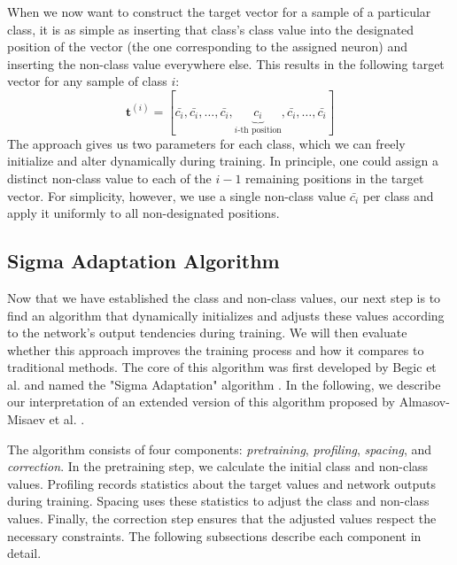 \documentclass[12pt,fleqn,a4paper]{article}
\begin{document}
When we now want to construct the target vector for a sample of a particular class, it is as simple as inserting that class's class value into the designated position of the vector (the one corresponding to the assigned neuron) and inserting the non-class value everywhere else. This results in the following target vector for any sample of class $i$:
$$\mathbf{t}^{(i)} = [\bar{c_i}, \bar{c_i}, \ldots, \bar{c_i}, \underbrace{c_i}_{i\text{-th position}}, \bar{c_i}, \ldots, \bar{c_i}]$$
The approach gives us two parameters for each class, which we can freely initialize and alter dynamically during training. In principle, one could assign a distinct non-class value to each of the
$i-1$ remaining positions in the target vector. For simplicity, however, we use a single non-class value $\bar{c_i}$ per class and apply it uniformly to all non-designated positions.

\subsection{Sigma Adaptation Algorithm}\label{sec:sigma}
Now that we have established the class and non-class values, our next step is to find an algorithm that dynamically initializes and adjusts these values according to the network's output tendencies during training. We will then evaluate whether this approach improves the training process and how it compares to traditional methods. The core of this algorithm was first developed by Begic et al. and named the "Sigma Adaptation" algorithm \cite{begic}. In the following, we describe our interpretation of an extended version of this algorithm proposed by Almasov-Misaev et al. \cite{almasov}.

The algorithm consists of four components: \textit{pretraining},  \textit{profiling}, \textit{spacing}, and \textit{correction}. In the pretraining step, we calculate the initial class and non-class values. Profiling records statistics about the target values and network outputs during training. Spacing uses these statistics to adjust the class and non-class values. Finally, the correction step ensures that the adjusted values respect the necessary constraints. The following subsections describe each component in detail.
\end{document}
